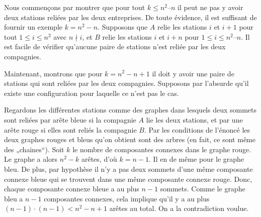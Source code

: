 \begin{sol}


Nous commençons par montrer que pour tout $k \leq n^2 – n$ il peut ne pas y avoir deux stations reliées par les deux entreprises. De toute évidence, il est suffisant de fournir un exemple $k =n^2 - n$.
Supposons que $ A$ relie les stations $i$ et $i+1$ pour tout $1 \leq i \leq n^2$ avec $n\nmid i$, et $B$ relie les stations $i$ et $i+n$ pour $1 \leq i \leq n^2 – n$.
 Il est facile de vérifier qu’aucune paire de stations n’est reliée par les deux compagnies.

Maintenant, montrons que pour $k=n^2-n+1$ il doit y avoir une paire de stations qui sont reliées par les deux compagnies.
Supposons par l’absurde qu’il existe une configuration pour laquelle ce n’est pas le cas.

Regardons les différentes stations comme des graphes dans lesquels deux sommets sont reliées par arête bleue si la compagnie $A$ lie les deux stations, et par une arête rouge si elles sont reliés la compagnie $B$. Par les conditions de l’énoncé les deux graphes rouges et bleus qu’on obtient sont des arbres (en fait, ce sont même des „chaines“). Soit $k$ le nombre de composantes connexes dans le graphe rouge. Le graphe a alors $n^2-k $ arêtes, d’où $k = n-1$. Il en de même pour le graphe bleu. De plus, par hypothèse il n’y a pas deux sommets d’une même composante connexe bleue qui se trouvent dans une même composante connexe rouge. Donc, chaque composante connexe bleue a au plus $n-1$ sommets. Comme le graphe bleu a $n-1$ composantes connexes, cela implique qu’il y a au plus $(n-1) \cdot (n-1) < n^2-n + 1$ arêtes au total. On a la contradiction voulue.\\
\end{sol}



